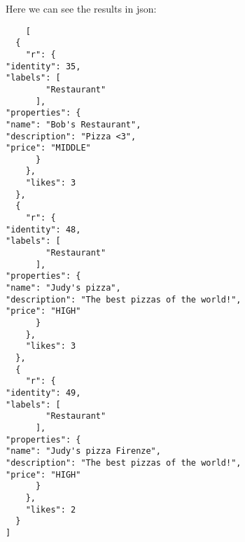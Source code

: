 
Here we can see the results in json:

\begin{verbatim}
    [
  {
    "r": {
"identity": 35,
"labels": [
        "Restaurant"
      ],
"properties": {
"name": "Bob's Restaurant",
"description": "Pizza <3",
"price": "MIDDLE"
      }
    },
    "likes": 3
  },
  {
    "r": {
"identity": 48,
"labels": [
        "Restaurant"
      ],
"properties": {
"name": "Judy's pizza",
"description": "The best pizzas of the world!",
"price": "HIGH"
      }
    },
    "likes": 3
  },
  {
    "r": {
"identity": 49,
"labels": [
        "Restaurant"
      ],
"properties": {
"name": "Judy's pizza Firenze",
"description": "The best pizzas of the world!",
"price": "HIGH"
      }
    },
    "likes": 2
  }
]
\end{verbatim}
